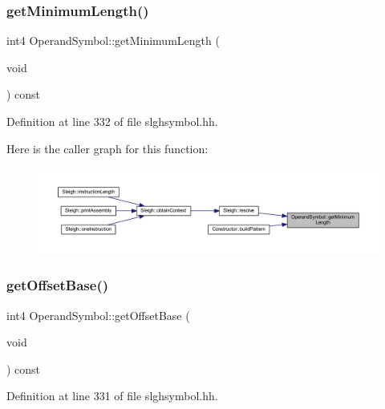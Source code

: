 \subsubsection{\texorpdfstring{getMinimumLength()}{getMinimumLength()}}
{\footnotesize\ttfamily int4 Operand\+Symbol\+::get\+Minimum\+Length (\begin{DoxyParamCaption}\item[{void}]{ }\end{DoxyParamCaption}) const\hspace{0.3cm}{\ttfamily [inline]}}



Definition at line 332 of file slghsymbol.\+hh.

Here is the caller graph for this function\+:
\nopagebreak
\begin{figure}[H]
\begin{center}
\leavevmode
\includegraphics[width=350pt]{class_operand_symbol_a449067986ae0236c97cbdec8de4c4723_icgraph}
\end{center}
\end{figure}
\mbox{\label{class_operand_symbol_ae4852740136d240df30da3fb8154e1fa}} 
\subsubsection{\texorpdfstring{getOffsetBase()}{getOffsetBase()}}
{\footnotesize\ttfamily int4 Operand\+Symbol\+::get\+Offset\+Base (\begin{DoxyParamCaption}\item[{void}]{ }\end{DoxyParamCaption}) const\hspace{0.3cm}{\ttfamily [inline]}}



Definition at line 331 of file slghsymbol.\+hh.

